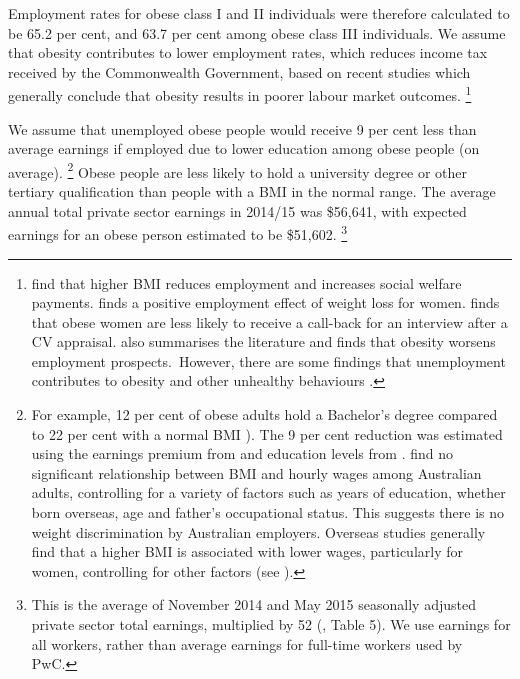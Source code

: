 \documentclass[embargoed]{grattan}
\begin{document}
Employment rates for obese class I and II individuals were therefore calculated to be 65.2 per cent, and 63.7 per cent among obese class III individuals.
We assume that obesity contributes to lower employment rates, which reduces income tax received by the Commonwealth Government, based on recent studies which generally conclude that obesity results in poorer labour market outcomes.%
\footnote{\textcite{Boeckerman2016EffectWeightLabor} find that higher BMI reduces employment and increases social welfare payments. \textcite{Reichert2015Obesityweightloss} finds a positive employment effect of weight loss for women. \textcite{Rooth2009Obesityattractivenessdifferential} finds that obese women are less likely to receive a call-back for an interview after a CV appraisal. \textcite{Cawley2015economyscalesselective} also summarises the literature and finds that obesity worsens employment prospects.~However, there are some findings that unemployment contributes to obesity and other unhealthy behaviours \textcites{Schmeiser2009Expandingwalletswaistlines}{Marcus2014Doesjobloss}.}

We assume that unemployed obese people would receive 9 per cent less than average earnings if employed due to lower education among obese people (on average).%
\footnote{For example, 12 per cent of obese adults hold a Bachelor’s degree compared to 22 per cent with a normal BMI \textcite{ABS20164364055011AustralianHealth}).
The 9 per cent reduction was estimated using the earnings premium from \textcite{Norton2012MappingAustralianhigher} and education levels from \textcite{ABS2013436405503AustralianHealth}. \textcite{Kortt2010Doessizematter} find no significant relationship between BMI and hourly wages among Australian adults, controlling for a variety of factors such as years of education, whether born overseas, age and father’s occupational status.
This suggests there is no weight discrimination by Australian employers.
Overseas studies generally find that a higher BMI is associated with lower wages, particularly for women, controlling for other factors (see \textcites{Cawley2004impactobesitywages}{Cawley2005comparisonrelationshipobesity}).}  Obese people are less likely to hold a university degree or other tertiary qualification than people with a BMI in the normal range.
The average annual total private sector earnings in 2014/15 was \$56,641, with expected earnings for an obese person estimated to be \$51,602.%
\footnote{This is the average of November 2014 and May 2015 seasonally adjusted private sector total earnings, multiplied by 52 (\textcite{ABS201663020AverageWeekly}, Table 5).
We use earnings for all workers, rather than average earnings for full-time workers used by PwC.}  
\end{document}
